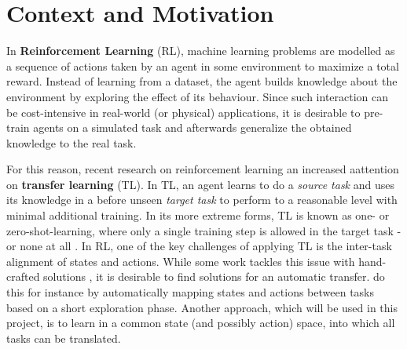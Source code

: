 \section{Context and Motivation}
\label{sec:context}

In \textbf{Reinforcement Learning} (RL), machine learning problems are modelled as a sequence of actions taken by an agent in some environment to maximize a total reward. Instead of learning from a dataset, the agent builds knowledge about the environment by exploring the effect of its behaviour. Since such interaction can be cost-intensive in real-world (or physical) applications, it is desirable to pre-train agents on a simulated task and afterwards generalize the obtained knowledge to the real task. 

For this reason, recent research on reinforcement learning an increased aattention on \textbf{transfer learning} (TL). In TL, an agent learns to do a \textit{source task} and uses its knowledge in a before unseen \textit{target task} to perform to a reasonable level with minimal additional training. In its more extreme forms, TL is known as one- or zero-shot-learning, where only a single training step is allowed in the target task - or none at all \citep{goodfellow2016deep}. In RL, one of the key challenges of applying TL is the inter-task alignment of states and actions. While some work tackles this issue with hand-crafted solutions \citep[e.g.][]{taylor2007cross}, it is desirable to find solutions for an automatic transfer. \citep{taylor2008autonomous} do this for instance by automatically mapping states and actions between tasks based on a short exploration phase. Another approach, which will be used in this project, is to learn in a common state (and possibly action) space, into which all tasks can be translated.

